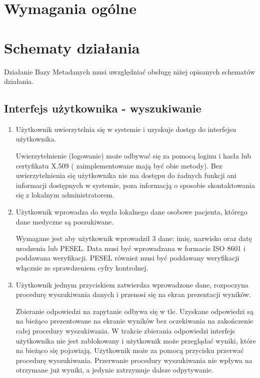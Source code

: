\documentclass[a4paper]{report}
\begin{document}
\section{Wymagania ogólne}

\section{Schematy działania}

Działanie Bazy Metadanych musi uwzględniać obsługę niżej opisanych schematów działania.

\subsection{Interfejs użytkownika - wyszukiwanie}
\begin{enumerate}
  \item Użytkownik uwierzytelnia się w systemie i uzyskuje dostęp do interfejsu użytkownika.

    Uwierzytelnienie (logowanie) może odbywać się za pomocą loginu i hasła lub certyfikatu X.509 (
    zaimplementowane mają być obie metody). Bez uwierzytelnienia się użytkownika nie ma dostępu do
    żadnych funkcji ani informacji dostępnych w systemie, poza informacją o sposobie skontaktowania
    się z lokalnym administratorem.

  \item Użytkownik wprowadza do węzła lokalnego dane osobowe pacjenta, którego dane medyczne są poszukiwane.

        Wymagane jest aby użytkownik wprowadził 3 dane: imię, nazwisko oraz datę urodzenia lub PESEL.
        Data musi być wprowadzana w formacie ISO 8601 i poddawana weryfikacji. PESEL również musi być
        poddawany weryfikacji włącznie ze sprawdzeniem cyfry kontrolnej.
  
  \item Użytkownik jednym przyciskiem zatwierdza wprowadzone dane, rozpoczyna procedurę wyszukiwania danych i przenosi
  się na ekran prezentacji wyników.

        Zbieranie odpowiedzi na zapytanie odbywa się w tle. Uzyskane odpowiedzi są na bieżąco prezentowane na
        ekranie wyników bez oczekiwania na zakończenie całej procedury wyszukiwania. W trakcie zbierania odpowiedzi
        interfejs użytkownika nie jest zablokowany i użytkownik może przeglądać wyniki, które na bieżąco się pojawiają.
        Użytkownik może za pomocą przycisku przerwać procedurę wyszukiwania. Przerwanie procedury wyszukiwania
        nie wpływa na otrzymane już wyniki, a jedynie zatrzymuje dalsze odpytywanie.
  
\end{enumerate}
\end{document}
